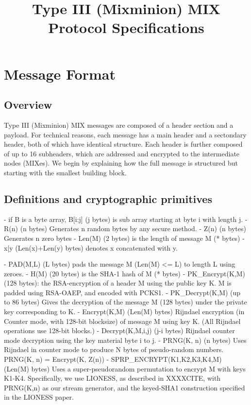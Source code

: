 \title{Type III (Mixminion) MIX Protocol Specifications}

\section{Message Format}

\subsection{Overview}

Type III (Mixminion) MIX messages are composed of a header section and a
payload.  For technical reasons, each message has a main header and a
sectondary header, both of which have identical structure.  Each
header is further composed of up to 16 subheaders, which are
addressed and encrypted to the intermediate nodes (MIXes).  We
begin by explaining how the full message is structured but starting
with the smallest building block.

\subsection{Definitions and cryptographic primitives}

- if B is a byte array, B[i:j] (j bytes) is sub array starting at 
  byte i with length j.
- R(n) (n bytes) Generates n random bytes by any secure method.
- Z(n) (n bytes) Generates n zero bytes
- Len(M) (2 bytes) is the length of message M (* bytes)
- x|y (Len(x)+Len(y) bytes) denotes x concatenated with y.

- PAD(M,L) (L bytes) pads the message M (Len(M) <= L) to length L
  using zeroes.
- H(M) (20 bytes) is the SHA-1 hash of M (* bytes)
- PK_Encrypt(K,M) (128 bytes): the RSA-encryption of a header M 
  using the public key K.  M is padded using RSA-OAEP, and encoded
  with PCKS1.
- PK_Decrypt(K,M) (up to 86 bytes) Gives the decryption of the
  message M (128 bytes) under the private key corresponding to K.
- Encrypt(K,M) (Len(M) bytes) Rijndael encryption (in Counter mode,
  with 128-bit blocksize) of message M using key K.  (All Rijndael
  operations use 128-bit blocks.)
- Decrypt(K,M,i,j) (j-i bytes) Rijndael counter mode decryption 
  using the key material byte i to j.
- PRNG(K, n) (n bytes) Uses Rijndael in counter mode to produce N
  bytes of pseudo-random numbers.
  PRNG(K, n) = Encrypt(K, Z(n))
- SPRP_ENCRYPT(K1,K2,K3,K4,M) (Len(M) bytes) Uses a super-pseudorandom
  permutation to encrypt M with keys K1-K4.  Specifically, we use LIONESS,
  as described in XXXXCITE, with PRNG(K,n) as our stream generator,
  and the keyed-SHA1 construction specified in the LIONESS paper.

